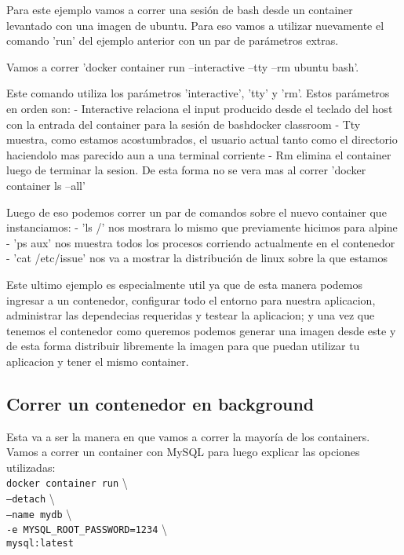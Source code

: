\documentclass[11pt]{article} %
\begin{document}
Para este ejemplo vamos a correr una sesión de bash desde un container levantado con una imagen de ubuntu. Para eso vamos a utilizar nuevamente el comando 'run' del ejemplo anterior con un par de parámetros extras.

Vamos a correr 'docker container run --interactive --tty --rm ubuntu bash'. 

Este comando utiliza los parámetros 'interactive', 'tty' y 'rm'. Estos parámetros en orden son:
    - Interactive relaciona el input producido desde el teclado del host con la entrada del container para la sesión de bashdocker classroom
    - Tty muestra, como estamos acostumbrados, el usuario actual tanto como el directorio haciendolo mas parecido aun a una terminal corriente
    - Rm elimina el container luego de terminar la sesion. De esta forma no se vera mas al correr 'docker container ls --all'

Luego de eso podemos correr un par de comandos sobre el nuevo container que instanciamos:
    - 'ls /' nos mostrara lo mismo que previamente hicimos para alpine
    - 'ps aux' nos muestra todos los procesos corriendo actualmente en el contenedor
    - 'cat /etc/issue' nos va a mostrar la distribución de linux sobre la que estamos

Este ultimo ejemplo es especialmente util ya que de esta manera podemos ingresar a un contenedor, configurar todo el entorno para nuestra aplicacion, administrar las dependecias requeridas y testear la aplicacion; y una vez que tenemos el contenedor como queremos podemos generar una imagen desde este y de esta forma distribuir libremente la imagen para que puedan utilizar tu aplicacion y tener el mismo container.

\subsection{Correr un contenedor en background}

Esta va a ser la manera en que vamos a correr la mayoría de los containers.\\
Vamos a correr un container con MySQL para luego explicar las opciones utilizadas:\\
	
		\texttt{docker container run} \textbackslash \\
		\texttt{--detach} \textbackslash \\
		\texttt{--name mydb} \textbackslash \\
		\texttt{-e MYSQL\_ROOT\_PASSWORD=1234} \textbackslash \\
		\texttt{mysql:latest}
	\\
\end{document}
